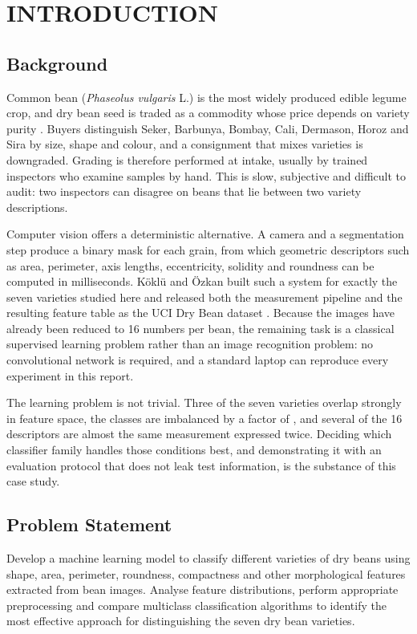 \chapter{INTRODUCTION}

\section{Background}

Common bean (\textit{Phaseolus vulgaris} L.) is the most widely produced edible
legume crop, and dry bean seed is traded as a commodity whose price depends on
variety purity \cite{koklu2020}. Buyers distinguish Seker, Barbunya, Bombay,
Cali, Dermason, Horoz and Sira by size, shape and colour, and a consignment that
mixes varieties is downgraded. Grading is therefore performed at intake, usually
by trained inspectors who examine samples by hand. This is slow, subjective and
difficult to audit: two inspectors can disagree on beans that lie between two
variety descriptions.

Computer vision offers a deterministic alternative. A camera and a segmentation
step produce a binary mask for each grain, from which geometric descriptors such
as area, perimeter, axis lengths, eccentricity, solidity and roundness can be
computed in milliseconds. Köklü and Özkan built such a system for exactly the
seven varieties studied here and released both the measurement pipeline and the
resulting feature table as the UCI Dry Bean dataset \cite{uci602, koklu2020}.
Because the images have already been reduced to 16 numbers per bean, the
remaining task is a classical supervised learning problem rather than an image
recognition problem: no convolutional network is required, and a standard laptop
can reproduce every experiment in this report.

The learning problem is not trivial. Three of the seven varieties overlap
strongly in feature space, the classes are imbalanced by a factor of
\ImbalanceRatio, and several of the 16 descriptors are almost the same
measurement expressed twice. Deciding which classifier family handles those
conditions best, and demonstrating it with an evaluation protocol that does not
leak test information, is the substance of this case study.

\section{Problem Statement}

Develop a machine learning model to classify different varieties of dry beans
using shape, area, perimeter, roundness, compactness and other morphological
features extracted from bean images. Analyse feature distributions, perform
appropriate preprocessing and compare multiclass classification algorithms to
identify the most effective approach for distinguishing the seven dry bean
varieties.

